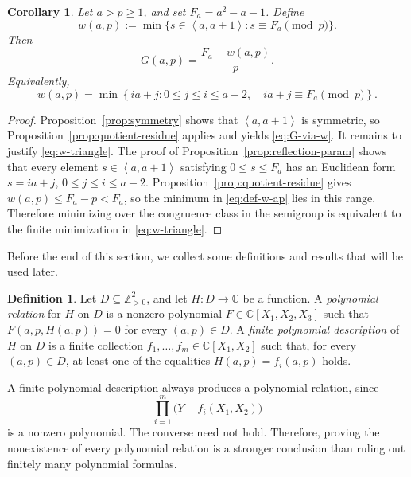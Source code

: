 \documentclass[reqno, 12pt]{article}
\numberwithin{equation}{section}
\newtheorem{corollary}[theorem]{Corollary}
\theoremstyle{definition}
\newtheorem{definition}[theorem]{Definition}
\newcommand{\ZZ}{\mathbb{Z}}
\newcommand{\CC}{\mathbb{C}}
\newcommand{\gen}[1]{\left\langle #1\right\rangle}
\begin{document}
\begin{corollary}\label{cor:modular-minimization}
Let $a>p\ge1$, and set $F_a=a^2-a-1$.  Define
\begin{equation}\label{eq:def-w-ap}
   w(a,p):=\min\{s\in\gen{a,a+1}:s\equiv F_a\pmod p\}.
\end{equation}
Then
\begin{equation}\label{eq:G-via-w}
   G(a,p)=\frac{F_a-w(a,p)}{p}.
\end{equation}
Equivalently,
\begin{equation}\label{eq:w-triangle}
 w(a,p)=\min\left\{ia+j:0\le j\le i\le a-2,\quad ia+j\equiv F_a\pmod p\right\}.
\end{equation}
\end{corollary}
\begin{proof}
Proposition~\ref{prop:symmetry} shows that $\gen{a,a+1}$ is symmetric, so Proposition~\ref{prop:quotient-residue}
applies and yields \cref{eq:G-via-w}.
It remains to justify \cref{eq:w-triangle}.  The proof of
Proposition~\ref{prop:reflection-param} shows that every element
$s\in\gen{a,a+1}$ satisfying $0\le s\le F_a$ has an Euclidean form $s=ia+j$, $0\le j\le i\le a-2$.
Proposition~\ref{prop:quotient-residue} gives
$w(a,p)\le F_a-p<F_a$, so the minimum in \cref{eq:def-w-ap} lies in this
range.  Therefore minimizing over the congruence class in the semigroup is
equivalent to the finite minimization in \cref{eq:w-triangle}.
\end{proof}


Before the end of this section, we collect some definitions and results that will be used later.

\begin{definition}\label{def:polynomial-description}
Let $D\subseteq\ZZ_{>0}^2$, and let $H:D\to\CC$ be a function. A \emph{polynomial relation} for $H$ on $D$ is a nonzero polynomial
$F\in\CC[X_1,X_2,X_3]$ such that $F(a,p,H(a,p))=0$ for every $(a,p)\in D$.
A \emph{finite polynomial description} of $H$ on $D$ is a finite collection $f_1,\ldots,f_m\in\CC[X_1,X_2]$ such that, for every $(a,p)\in D$, at least one of the equalities $H(a,p)=f_i(a,p)$ holds.
\end{definition}

A finite polynomial description always produces a polynomial relation, since
\[\prod_{i=1}^m\bigl(Y-f_i(X_1,X_2)\bigr)
\]
is a nonzero polynomial. 
The converse need not hold. Therefore, proving the nonexistence of every polynomial relation is a stronger conclusion than ruling out finitely many polynomial formulas.
\end{document}
